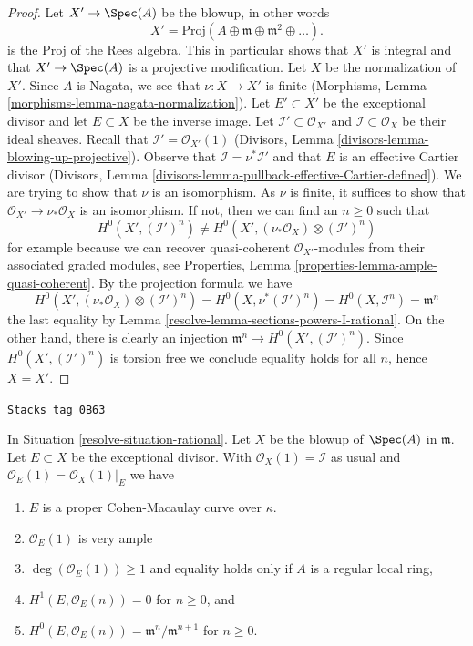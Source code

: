 \begin{proof}

Let $X' \to \Spec(A)$ be the blowup, in other words
$$
X' = \text{Proj}(A \oplus \mathfrak m \oplus \mathfrak m^2 \oplus \ldots).
$$
is the Proj of the Rees algebra. This in particular shows that
$X'$ is integral and that $X' \to \Spec(A)$ is a projective
modification. Let $X$ be the normalization of $X'$.
Since $A$ is Nagata, we see that $\nu : X \to X'$ is finite
(Morphisms, Lemma \ref{morphisms-lemma-nagata-normalization}).
Let $E' \subset X'$ be the exceptional divisor and let $E \subset X$
be the inverse image. Let $\mathcal{I}' \subset \mathcal{O}_{X'}$
and $\mathcal{I} \subset \mathcal{O}_X$ be their ideal sheaves.
Recall that $\mathcal{I}' = \mathcal{O}_{X'}(1)$
(Divisors, Lemma \ref{divisors-lemma-blowing-up-projective}).
Observe that $\mathcal{I} = \nu^*\mathcal{I}'$ and that $E$ is an
effective Cartier divisor (Divisors, Lemma
\ref{divisors-lemma-pullback-effective-Cartier-defined}).
We are trying to show that $\nu$ is an isomorphism. As $\nu$ is finite,
it suffices to show that $\mathcal{O}_{X'} \to \nu_*\mathcal{O}_X$
is an isomorphism. If not, then we can find an $n \geq 0$ such that
$$
H^0(X', (\mathcal{I}')^n) \not =
H^0(X', (\nu_*\mathcal{O}_X) \otimes (\mathcal{I}')^n)
$$
for example because we can recover quasi-coherent $\mathcal{O}_{X'}$-modules
from their associated graded modules, see
Properties, Lemma \ref{properties-lemma-ample-quasi-coherent}.
By the projection formula we have
$$
H^0(X', (\nu_*\mathcal{O}_X) \otimes (\mathcal{I}')^n) =
H^0(X, \nu^*(\mathcal{I}')^n) =
H^0(X, \mathcal{I}^n) = \mathfrak m^n
$$
the last equality by Lemma \ref{resolve-lemma-sections-powers-I-rational}.
On the other hand, there is clearly an injection
$\mathfrak m^n \to H^0(X', (\mathcal{I}')^n)$. Since
$H^0(X', (\mathcal{I}')^n)$ is torsion free we conclude equality holds
for all $n$, hence $X = X'$.
\end{proof}

\begin{lemma}
\label{resolve-lemma-cohomology-blow-up-rational}
\href{https://stacks.math.columbia.edu/tag/0B63}{\texttt{Stacks tag 0B63}}

In Situation \ref{resolve-situation-rational}.
Let $X$ be the blowup of $\Spec(A)$ in $\mathfrak m$. Let $E \subset X$
be the exceptional divisor. With $\mathcal{O}_X(1) = \mathcal{I}$ as
usual and $\mathcal{O}_E(1) = \mathcal{O}_X(1)|_E$ we have
\begin{enumerate}
\item $E$ is a proper Cohen-Macaulay curve over $\kappa$.
\item $\mathcal{O}_E(1)$ is very ample
\item $\deg(\mathcal{O}_E(1)) \geq 1$ and equality holds only if
$A$ is a regular local ring,
\item $H^1(E, \mathcal{O}_E(n)) = 0$ for $n \geq 0$, and
\item $H^0(E, \mathcal{O}_E(n)) = \mathfrak m^n/\mathfrak m^{n + 1}$
for $n \geq 0$.
\end{enumerate}
\end{lemma}

